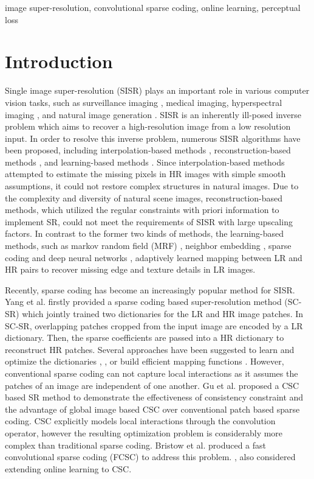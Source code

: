\documentclass[conference]{IEEEtran}
\begin{document}
\begin{IEEEkeywords}
image super-resolution, convolutional sparse coding, online learning, perceptual loss
\end{IEEEkeywords}

\section{Introduction}
Single image super-resolution (SISR) plays an important role in various computer vision tasks, such as surveillance imaging \cite{b1}, medical imaging, \cite{b2} hyperspectral imaging \cite{b3}, and natural image generation \cite{b4}. SISR is an inherently ill-posed inverse problem which aims to recover a high-resolution image from a low resolution input. In order to resolve this inverse problem, numerous SISR algorithms have been proposed, including interpolation-based methods \cite{b5}, reconstruction-based methods \cite{b6}, and learning-based methods \cite{b7}. Since interpolation-based methods attempted to estimate the missing pixels in HR images with simple smooth assumptions, it could not restore complex structures in natural images. Due to the complexity and diversity of natural scene images, reconstruction-based methods, which utilized the regular constraints with priori information to implement SR, could not meet the requirements of SISR with large upscaling factors. In contrast to the former two kinds of methods, the learning-based methods, such as markov random field (MRF) \cite{b8}, neighbor embedding \cite{b9}, sparse coding \cite{b10} and deep neural networks \cite{b11}, adaptively learned mapping between LR and HR pairs to recover missing edge and texture details in LR images. 

Recently, sparse coding has become an increasingly popular method for SISR. Yang et al. \cite{b10} firstly provided a sparse coding based super-resolution method (SC-SR) which jointly trained two dictionaries for the LR and HR image patches. In SC-SR, overlapping  patches cropped from the input image are encoded by a LR dictionary. Then, the sparse coefficients are passed into a HR dictionary to reconstruct HR patches. Several approaches have been suggested
to learn and optimize the dictionaries \cite{b12}, \cite{b13}, \cite{b14} or build efficient mapping functions \cite{b15}. However, conventional sparse coding can not capture local interactions as it assumes the patches of an image are independent of one another. Gu et al. \cite{b16} proposed a CSC based SR method to demonstrate the effectiveness of consistency constraint and the advantage of global image based CSC over conventional patch based sparse coding. CSC explicitly models local interactions through the convolution operator, however the resulting optimization problem is considerably more complex than traditional sparse coding. Bristow et al. \cite{b17} produced a fast convolutional sparse coding (FCSC) to address this problem. \cite{b18}, \cite{b19} also considered extending online learning to CSC.
\end{document}
